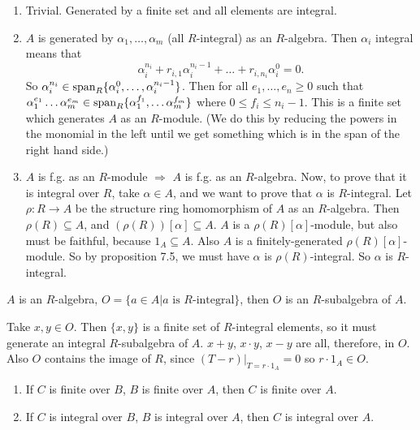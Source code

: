 \documentclass{article}
\begin{document}
\proof \hspace{0.1cm}\begin{enumerate}
    \item[(1) $\Rightarrow$ (2)] Trivial. Generated by a finite set and all elements are integral.
    \item[(2) $\Rightarrow$ (3)] $A$ is generated by $\alpha_{1}, \dots, \alpha_{m}$ (all $R$-integral) as an $R$-algebra. Then $\alpha_{i}$ integral means that \[\alpha_{i}^{n_{i}} + r_{i,1}\alpha_{i}^{n_{i}-1} + \dots + r_{i,n_{i}}\alpha_{i}^{0} = 0.\] So $\alpha_{i}^{n_{i}} \in \operatorname{span}_{R}\{\alpha_{i}^{0}, \dots, \alpha_{i}^{n_{i}-1}\}$. Then for all $e_{1}, \dots, e_{n} \geq 0$ such that $\alpha_{1}^{e_{1}} \dots \alpha_{m}^{e_{m}} \in \operatorname{span}_{R}\{ \alpha_{1}^{f_{1}}, \dots \alpha_{m}^{f_{m}}\}$ where $0 \leq f_{i} \leq n_{i}-1$. This is a finite set which generates $A$ as an $R$-module. (We do this by reducing the powers in the monomial in the left until we get something which is in the span of the right hand side.)
    \item[(3) $\Rightarrow$ (1)] $A$ is f.g. as an $R$-module $\Rightarrow$ $A$ is f.g. as an $R$-algebra. \gap Now, to prove that it is integral over $R$, take $\alpha \in A$, and we want to prove that $\alpha$ is $R$-integral. Let $\rho : R \to A$ be the structure ring homomorphism of $A$ as an $R$-algebra. Then $\rho(R) \subseteq A$, and $(\rho(R))[\alpha] \subseteq A$. $A$ is a $\rho(R)[\alpha]$-module, but also must be faithful, because $1_{A} \subseteq A$. Also $A$ is a finitely-generated $\rho(R)[\alpha]$-module. So by proposition 7.5, we must have $\alpha$ is $\rho(R)$-integral. So $\alpha$ is $R$-integral.
\end{enumerate}
\endproof
\begin{fancyprop}{}
    $A$ is an $R$-algebra, $O = \{ a \in A | a \text{ is $R$-integral} \}$, then $O$ is an $R$-subalgebra of $A$.
\end{fancyprop}
\proof Take $x,y \in O$. Then $\{x,y\}$ is a finite set of $R$-integral elements, so it must generate an integral $R$-subalgebra of $A$. $x+y$, $x \cdot y$, $x - y$ are all, therefore, in $O$. Also $O$ contains the image of $R$, since $(T-r)|_{T=r\cdot 1_{A}} = 0$ so $r\cdot 1_{A} \in O$.  \endproof
\begin{fancyprop}{}\hspace{0.1cm}
    \begin{enumerate}
        \item If $C$ is finite over $B$, $B$ is finite over $A$, then $C$ is finite over $A$.
        \item If $C$ is integral over $B$, $B$ is integral over $A$, then $C$ is integral over $A$.
    \end{enumerate}
    
\end{fancyprop}
\end{document}
